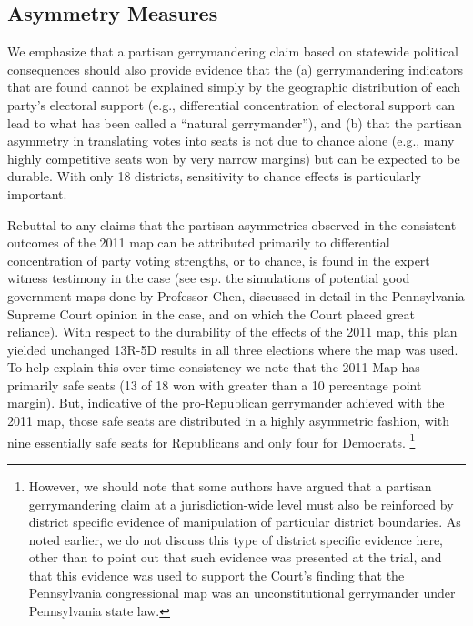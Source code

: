             \subsection*{Asymmetry Measures}
    We emphasize that a partisan gerrymandering claim based on statewide political consequences should also provide evidence that the (a) gerrymandering indicators that are found cannot be explained simply by the geographic distribution of each party’s electoral support (e.g., differential concentration of electoral support can lead to what has been called a ``natural gerrymander''), and (b) that the partisan asymmetry in translating votes into seats is not due to chance alone (e.g., many highly competitive seats won by very narrow margins) but can be expected to be durable. With only 18 districts, sensitivity to chance effects is particularly important. 
\par
    Rebuttal to any claims that the partisan asymmetries observed in the consistent outcomes of the 2011 map can be attributed primarily to differential concentration of party voting strengths, or to chance, is found in the expert witness testimony in the case (see esp. the simulations of potential good government maps done by Professor Chen, discussed in detail in the Pennsylvania Supreme Court opinion in the case, and on which the Court placed great reliance). With respect to the durability of the effects of the 2011 map, this plan yielded unchanged 13R-5D results in all three elections where the map was used. To help explain this over time consistency we note that the 2011 Map has primarily safe seats (13 of 18 won with greater than a 10 percentage point margin). But, indicative of the pro-Republican gerrymander achieved with the 2011 map, those safe seats are distributed in a highly asymmetric fashion, with nine essentially safe seats for Republicans and only four for Democrats.
        \footnote{However, we should note that some authors \citep[e.g.,][]{Grofman2019_ELJ} have argued that a partisan gerrymandering claim at a jurisdiction-wide level must also be reinforced by district specific evidence of manipulation of particular district boundaries. As noted earlier, we do not discuss this type of district specific evidence here, other than to point out that such evidence was presented at the trial, and that this evidence was used to support the Court’s finding that the Pennsylvania congressional map was an unconstitutional gerrymander under Pennsylvania state law.}
